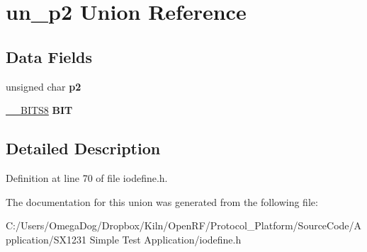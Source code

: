\hypertarget{unionun__p2}{\section{un\-\_\-p2 Union Reference}
\label{unionun__p2}
}
\subsection*{Data Fields}
\begin{DoxyCompactItemize}
\item 
\hypertarget{unionun__p2_aa11f03f50d2bc8dfeaddbbf38b8f676e}{unsigned char {\bfseries p2}}\label{unionun__p2_aa11f03f50d2bc8dfeaddbbf38b8f676e}

\item 
\hypertarget{unionun__p2_a4e6cd506e62e9d90d30c88a610380609}{\hyperlink{struct_____b_i_t_s8}{\-\_\-\-\_\-\-B\-I\-T\-S8} {\bfseries B\-I\-T}}\label{unionun__p2_a4e6cd506e62e9d90d30c88a610380609}

\end{DoxyCompactItemize}


\subsection{Detailed Description}


Definition at line 70 of file iodefine.\-h.



The documentation for this union was generated from the following file\-:\begin{DoxyCompactItemize}
\item 
C\-:/\-Users/\-Omega\-Dog/\-Dropbox/\-Kiln/\-Open\-R\-F/\-Protocol\-\_\-\-Platform/\-Source\-Code/\-Application/\-S\-X1231 Simple Test Application/iodefine.\-h\end{DoxyCompactItemize}
